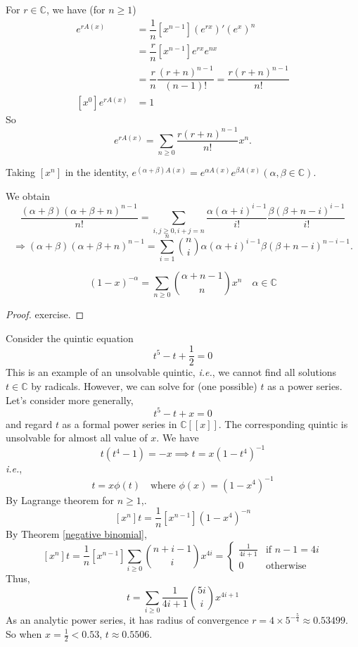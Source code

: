\begin{theorem}
For $r\in \mathbb{C}$, we have (for $n\geq 1$)
\begin{align*}
[x^n]e^{rA(x)} &= \dfrac{1}{n}[x^{n-1}](e^{rx})'(e^x)^n\\
&=\dfrac{r}{n}[x^{n-1}]e^{rx}e^{nx}\\
&=\dfrac{r}{n}\dfrac{(r+n)^{n-1}}{(n-1)!}=\dfrac{r(r+n)^{n-1}}{n!}\\
[x^0]e^{rA(x)}&=1
\end{align*}
So $$e^{rA(x)}=\sum_{n\geq 0}\dfrac{r(r+n)^{n-1}}{n!}x^n.$$

Taking $[x^n]$ in the identity,
$e^{(\alpha +\beta)A(x)}=e^{\alpha A(x)}e^{\beta A(x)}(\alpha , \beta \in \mathbb{C}).$

We obtain
$$\dfrac{(\alpha+\beta)(\alpha+\beta+n)^{n-1}}{n!}=\sum\limits_{i,j\geq 0, i+j=n} \dfrac{\alpha(\alpha+i)^{i-1}}{i!}\dfrac{\beta(\beta+n-i)^{i-1}}{i!}$$
$$\Rightarrow (\alpha+\beta)(\alpha+\beta+n)^{n-1}=\sum\limits_{i=1}^n{\binom{n}{i}} \alpha (\alpha+i)^{i-1} \beta (\beta+n-i)^{n-i-1}.$$
\end{theorem}

\begin{theorem}
\label{negative binomial}
\[ (1-x)^{-\alpha}=\sum_{n\geq0}\binom{\alpha+n-1}{n}x^n \quad \alpha\in\mathbb{C} \]    
\end{theorem}
\begin{proof}
exercise.
\end{proof}

\begin{example}
Consider the quintic equation
\[ t^5-t+\frac{1}{2}=0 \]
This is an example of an unsolvable quintic, \textit{i.e.}, we cannot find all solutions \(t\in\mathbb{C}\) by radicals.
However, we can solve for (one possible) \(t\) as a power series.
Let's consider more generally,
\[ t^5-t+x=0 \]
and regard \(t\) as a formal power series in \(\mathbb{C}[[x]]\).
The corresponding quintic is unsolvable for almost all value of \(x\).
We have
\[ t\left(t^4-1\right)=-x \implies t=x\left(1-t^4\right)^{-1} \]
\textit{i.e.},
\[ t=x\phi(t) \quad\text{where } \phi(x)=\left(1-x^4\right)^{-1} \]
By Lagrange theorem for \(n\geq1\),.
\[ \left[x^n\right]t=\frac{1}{n}\left[x^{n-1}\right]\left(1-x^4\right)^{-n} \]
By Theorem \ref{negative binomial},
\[ \left[x^n\right]t=\frac{1}{n}\left[x^{n-1}\right]\sum_{i\geq0}\binom{n+i-1}{i}x^{4i}=\begin{cases} \frac{1}{4i+1}&\text{if } n-1=4i \\ 0 & \text{otherwise} \end{cases} \]
Thus,
\[ t=\sum_{i\geq0}\frac{1}{4i+1}\binom{5i}{i}x^{4i+1} \]
As an analytic power series, it has radius of convergence \(r=4\times5^{-\frac{5}{4}}\approx0.53499\).
So when \(x=\frac{1}{2}<0.53\), \(t\approx0.5506\).
\end{example}
